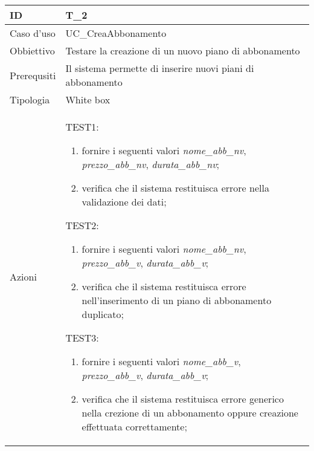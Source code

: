 \begin{table}[hb]
    \centering
    \begin{tabular}{ |p{2cm}|p{10cm}|  }
        \hline
        ID & T\_2 \\\hline
        Caso d'uso & UC\_CreaAbbonamento \\\hline   
        Obbiettivo & Testare la creazione di un nuovo piano di abbonamento \\\hline
        Prerequsiti & Il sistema permette di inserire nuovi piani di abbonamento \\\hline
        Tipologia & White box \\\hline
        Azioni & 
        TEST1:
        \begin{enumerate}[topsep=0pt]
            \item fornire i seguenti valori \emph{nome\_abb\_nv}, \emph{prezzo\_abb\_nv}, \emph{durata\_abb\_nv};
            \item verifica che il sistema restituisca errore nella validazione dei dati;
        \end{enumerate}
        \vspace{0.5cm} TEST2:
        \begin{enumerate}[topsep=0pt]
            \item fornire i seguenti valori \emph{nome\_abb\_nv}, \emph{prezzo\_abb\_v}, \emph{durata\_abb\_v};
            \item verifica che il sistema restituisca errore nell'inserimento di un piano di abbonamento duplicato;
        \end{enumerate}
        \vspace{0.5cm} TEST3:
        \begin{enumerate}[topsep=0pt]
            \item fornire i seguenti valori \emph{nome\_abb\_v}, \emph{prezzo\_abb\_v}, \emph{durata\_abb\_v};
            \item verifica che il sistema restituisca errore generico nella crezione di un abbonamento oppure creazione effettuata correttamente;
        \end{enumerate}
        \\\hline
    \end{tabular}
\end{table}

